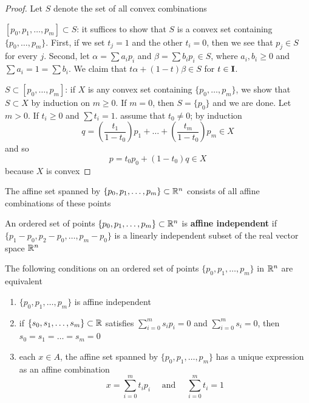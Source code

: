 \documentclass[11pt]{article}
\begin{document}
\begin{proof}
Let \(S\) denote the set of all convex combinations

\([p_0,p_1,\dots,p_m]\subset S\): it suffices to show that \(S\) is a convex set containing \(\{p_0,\dots,p_m\}\).
First, if we set \(t_j=1\) and the other \(t_i=0\), then we see that \(p_j\in S\) for every \(j\).
Second, let \(\alpha=\sum a_ip_i\) and \(\beta=\sum b_ip_i\in S\), where \(a_i,b_i\ge 0\) and \(\sum a_i=1=\sum b_i\). We claim
that \(t\alpha+(1-t)\beta\in S\) for \(t\in\operatorname{\textbf{I}}\).

\(S\subset[p_0,\dots,p_m]\): if \(X\) is any convex set containing \(\{p_0,\dots,p_m\}\), we show
that \(S\subset X\) by induction on \(m\ge 0\). If \(m=0\), then \(S=\{p_0\}\) and we are done.
Let \(m>0\). If \(t_i\ge 0\) and \(\sum t_i=1\). assume that \(t_0\neq 0\); by induction
\begin{equation*}
q=\left( \frac{t_1}{1-t_0} \right)p_1+\dots+\left( \frac{t_m}{1-t_0} \right)p_m\in X
\end{equation*}
and so
\begin{equation*}
p=t_0p_0+(1-t_0)q\in X
\end{equation*}
because \(X\) is convex
\end{proof}

\begin{corollary}[]
\label{cor2.3}
The affine set spanned by \(\{p_0,p_1,\dots,p_m\}\subset\mathbb{R}^n\) consists of all affine combinations of these points
\end{corollary}

\begin{definition}[]
An ordered set of points \(\{p_0,p_1,\dots,p_m\}\subset\mathbb{R}^n\) is \textbf{affine independent}
if \(\{p_1-p_0,p_2-p_0,\dots,p_m-p_0\}\) is a linearly independent subset of the real vector space \(\mathbb{R}^n\)
\end{definition}

\begin{theorem}[]
\label{thm2.4}
The following conditions on an ordered set of points \(\{p_0,p_1,\dots,p_m\}\) in \(\mathbb{R}^n\) are equivalent
\begin{enumerate}
\item \(\{p_0,p_1,\dots,p_m\}\) is affine independent
\item if \(\{s_0,s_1,\dots,s_m\}\subset\mathbb{R}\) satisfies \(\sum_{i=0}^ms_ip_i=0\) and \(\sum_{i=0}^ms_i=0\), then \(s_0=s_1=\dots=s_m=0\)
\item each \(x\in A\), the affine set spanned by \(\{p_0,p_1,\dots,p_m\}\) has a unique expression as an
affine combination
\begin{equation*}
x=\sum_{i=0}^mt_ip_i \quad\text{ and }\quad
\sum_{i=0}^mt_i=1
\end{equation*}
\end{enumerate}
\end{theorem}
\end{document}
